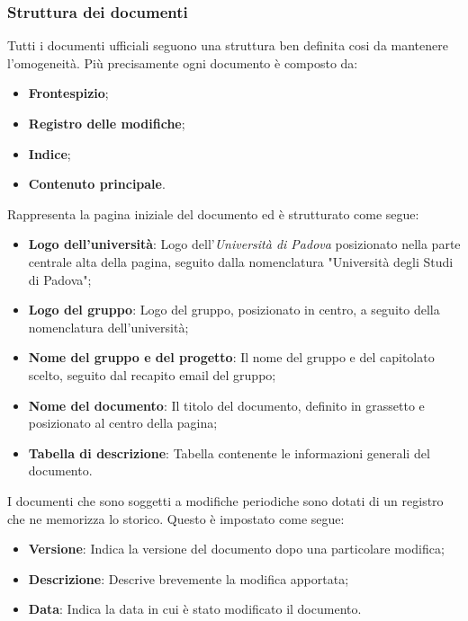 \subsubsection{Struttura dei documenti}
Tutti i documenti ufficiali seguono una struttura ben definita cosi da mantenere l'omogeneità. Più precisamente ogni documento è composto da:
\begin{itemize}
    \item \textbf{Frontespizio};
    \item \textbf{Registro delle modifiche};
    \item \textbf{Indice};
    \item \textbf{Contenuto principale}.
\end{itemize}

Rappresenta la pagina iniziale del documento ed è strutturato come segue:
\begin{itemize}
    \item \textbf{Logo dell'università}: Logo dell'\textit{Università di Padova} posizionato nella parte centrale alta della pagina, seguito dalla nomenclatura "Università degli  Studi di Padova";
    \item \textbf{Logo del gruppo}: Logo del gruppo, posizionato in centro, a seguito della nomenclatura dell'università;
    \item \textbf{Nome del gruppo e del progetto}: Il nome del gruppo e del capitolato scelto, seguito dal recapito email del gruppo;
    \item \textbf{Nome del documento}: Il titolo del documento, definito in grassetto e posizionato al centro della pagina;
    \item \textbf{Tabella di descrizione}: Tabella contenente le informazioni generali del documento.
\end{itemize}

I documenti che sono soggetti a modifiche periodiche sono dotati di un registro che ne memorizza lo storico. Questo è impostato come segue:
\begin{itemize}
    \item \textbf{Versione}: Indica la versione del documento dopo una particolare modifica;
    \item \textbf{Descrizione}: Descrive brevemente la modifica apportata;
    \item \textbf{Data}: Indica la data in cui è stato modificato il documento.
\end{itemize}


